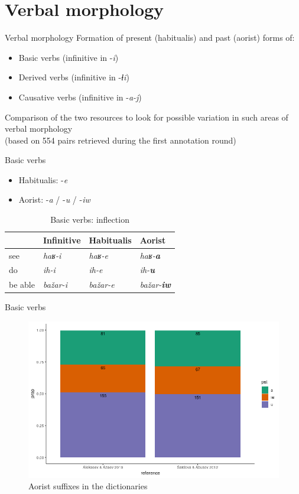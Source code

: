 \section{Verbal morphology}
\begin{frame}{Verbal morphology}
Formation of present (habitualis) and past (aorist) forms of:
\begin{itemize}
    \item Basic verbs (infinitive in -\textit{i})
    \item Derived verbs (infinitive in -\textit{ɬi})
    \item Causative verbs (infinitive in -\textit{a-j})
\end{itemize}
Comparison of the two resources to look for possible variation in such areas of verbal morphology \\ (based on 554 pairs retrieved during the first annotation round)    
\end{frame}

\begin{frame}{Basic verbs}
\begin{itemize}
    \item Habitualis: -\textit{e}
    \item Aorist: -\textit{a} / -\textit{u} / -\textit{iw}
\end{itemize}
\begin{table}[]
\caption{Basic verbs: inflection}
\centering
\begin{tabular}{l|l|l|l}
        & Infinitive       & Habitualis       & Aorist            \\ \hline
see     & \textit{haʁ-i}   & \textit{haʁ-e}   & \textit{haʁ-\textbf{a}}    \\
do      & \textit{ih-i}    & \textit{ih-e}    & \textit{ih-\textbf{u}}     \\
be able & \textit{bažar-i} & \textit{bažar-e} & \textit{bažar-\textbf{iw}}
\end{tabular}
\end{table}
\end{frame}

\begin{frame}{Basic verbs}
\begin{figure}[h]
\centering
\caption{Aorist suffixes in the dictionaries}
\includegraphics[scale=0.5]{images/pst.png}
\end{figure}
\end{frame}

